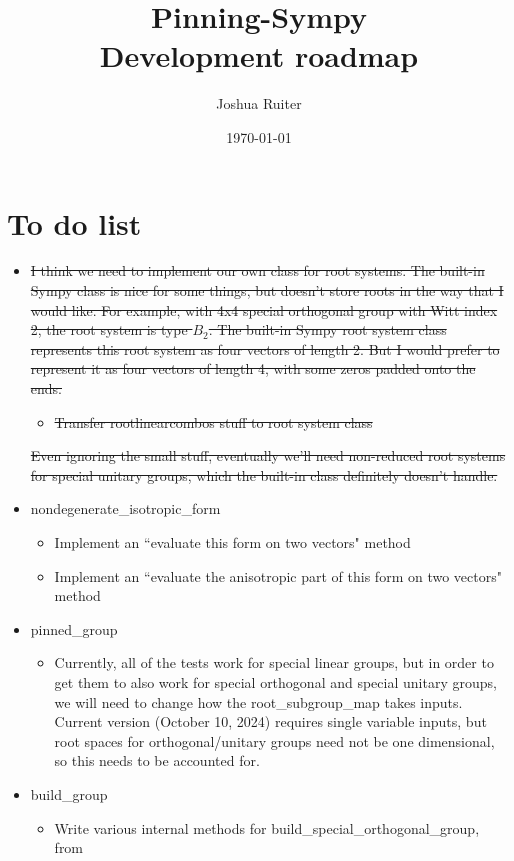 \documentclass[12pt]{article}
\title{Pinning-Sympy \\
	Development roadmap}
\author{Joshua Ruiter}
\date{\today}
\begin{document}
\maketitle
\tableofcontents

\newpage

\section{To do list}

\begin{itemize}
	\item \sout{I think we need to implement our own class for root systems. The built-in Sympy class is nice for some things, but doesn't store roots in the way that I would like. For example, with 4x4 special orthogonal group with Witt index 2, the root system is type $B_2$. The built-in Sympy root system class represents this root system as four vectors of length 2. But I would prefer to represent it as four vectors of length 4, with some zeros padded onto the ends.}
	\begin{itemize}
		\item \sout{Transfer rootlinearcombos stuff to root system class}
	\end{itemize}

	\sout{Even ignoring the small stuff, eventually we'll need non-reduced root systems for special unitary groups, which the built-in class definitely doesn't handle.}

	\item nondegenerate\_isotropic\_form
	\begin{itemize}
		\item Implement an ``evaluate this form on two vectors" method
		\item Implement an ``evaluate the anisotropic part of this form on two vectors" method
	\end{itemize}
	\item pinned\_group
	\begin{itemize}
		\item Currently, all of the tests work for special linear groups, but in order to get them to also work for special orthogonal and special unitary groups, we will need to change how the root\_subgroup\_map takes inputs. Current version (October 10, 2024) requires single variable inputs, but root spaces for orthogonal/unitary groups need not be one dimensional, so this needs to be accounted for.
	\end{itemize}
	\item build\_group
	\begin{itemize}
		\item Write various internal methods for build\_special\_orthogonal\_group, from 


\end{itemize}
\end{itemize}
\end{document}
